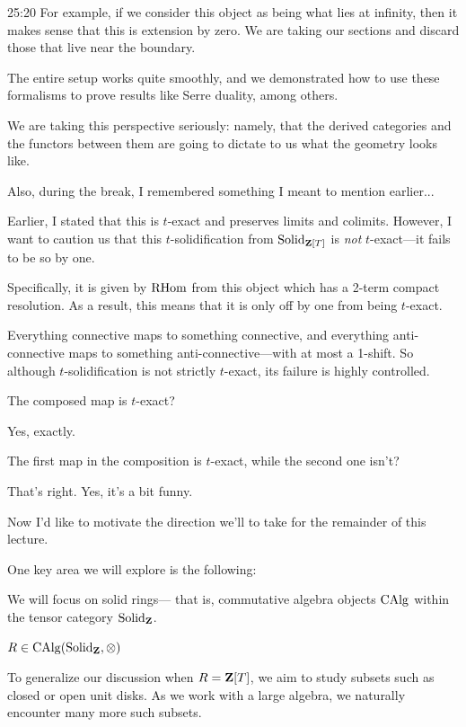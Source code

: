 \begin{unfinished}{25:20}
For example, if we consider this object  as being what lies at infinity, then it makes sense that this is extension by zero. We are taking our sections and discard those that live near the boundary. 

The entire setup works quite smoothly, and we demonstrated how to use these formalisms to prove results like Serre duality, among others.

We are taking this perspective seriously: namely, that the derived categories and the functors between them are going to dictate to us what the geometry looks like.

Also, during the break, I remembered something I meant to mention earlier...

\begin{warning}
Earlier, I stated that this  is $t$-exact and preserves limits and colimits. However, I want to caution us that this $t$-solidification from $\mathrm{Solid}_{\mathbf Z[T]}$ is \emph{not} $t$-exact---it fails to be so by one. 

Specifically, it is given by $\operatorname{RHom}$ from this object  which has a 2-term compact resolution. As a result, this means that it is only off by one from being $t$-exact.
\end{warning}

Everything connective maps to something connective, and everything anti-connective maps to something anti-connective---with at most a 1-shift. So although $t$-solidification is not strictly $t$-exact, its failure is highly controlled.

\ques The composed map is $t$-exact?

\ans Yes, exactly.

\ques The first map in the composition is $t$-exact, while the second one isn't?

\ans That's right. Yes, it's a bit funny.


Now I'd like to motivate the direction we'll to take for the remainder of this lecture.

One key area we will explore is the following:
\begin{vista}
We will focus on solid rings--- that is, commutative algebra objects $\operatorname{CAlg}$ within the tensor category $\mathrm{Solid}_{\mathbf Z}$.

$R \in \operatorname{CAlg}(\mathrm{Solid}_\mathbf Z, \otimes)$
\end{vista}

To generalize our discussion when $R = \mathbf Z[T]$, we aim to study subsets such as closed or open unit disks. As we work with a large algebra, we naturally encounter many more such subsets.


\end{unfinished}
